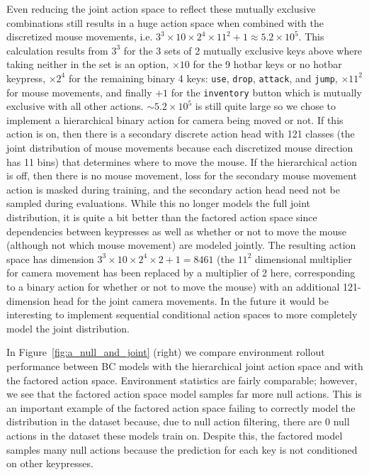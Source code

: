 Even reducing the joint action space to reflect these mutually exclusive combinations still results in a huge action space when combined with the discretized mouse movements, i.e. $3^3\times10\times2^4\times11^2 + 1 \approx 5.2\times10^5$. 
This calculation results from $3^3$ for the 3 sets of 2 mutually exclusive keys above where taking neither in the set is an option, $\times10$ for the 9 hotbar keys or no hotbar keypress, $\times2^4$ for the remaining binary 4 keys: \texttt{use}, \texttt{drop}, \texttt{attack}, and \texttt{jump}, $\times11^2$ for mouse movements, and finally $+1$ for the \texttt{inventory} button which is mutually exclusive with all other actions. $\sim5.2\times10^5$ is still quite large so we chose to implement a hierarchical binary action for camera being moved or not. If this action is on, then there is a secondary discrete action head with 121 classes (the joint distribution of mouse movements because each discretized mouse direction has 11 bins) that determines where to move the mouse. If the hierarchical action is off, then there is no mouse movement, loss for the secondary mouse movement action is masked during training, and the secondary action head need not be sampled during evaluations. While this no longer models the full joint distribution, 
it is quite a bit better than the factored action space since dependencies between keypresses as well as whether or not to move the mouse (although not which mouse movement) are modeled jointly. The resulting action space has dimension $3^3\times10\times2^4\times 2 + 1 = 8461$ (the $11^2$ dimensional multiplier for camera movement has been replaced by a multiplier of 2 here, corresponding to a binary action for whether or not to move the mouse) with an additional 121-dimension head for the joint camera movements. In the future it would be interesting to implement sequential conditional action spaces to more completely model the joint distribution.

In Figure~\ref{fig:a_null_and_joint} (right) we compare environment rollout performance between BC models with the hierarchical joint action space and with the factored action space. Environment statistics are fairly comparable; however, we see that the factored action space model samples far more null actions. This is an important example of the factored action space failing to correctly model the distribution in the dataset because, due to null action filtering, there are 0 null actions in the dataset these models train on. Despite this, the factored model samples many null actions because the prediction for each key is not conditioned on other keypresses.

